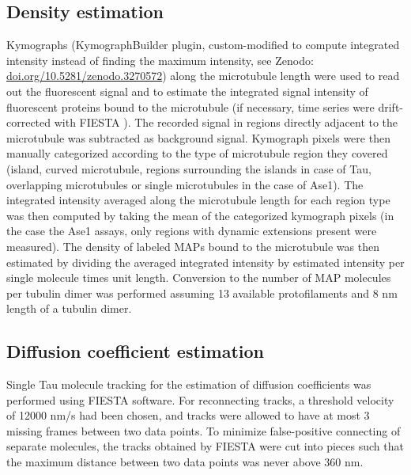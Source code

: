 \subsection{Density estimation}
Kymographs (KymographBuilder plugin, custom-modified to compute integrated intensity instead of finding the maximum intensity, see Zenodo: \url{doi.org/10.5281/zenodo.3270572}) along the microtubule length were used to read out the fluorescent signal and to estimate the integrated signal intensity of fluorescent proteins bound to the microtubule (if necessary, time series were drift-corrected with FIESTA \parencite{RUHNOW20112820}). The recorded signal in regions directly adjacent to the microtubule was subtracted as background signal. Kymograph pixels were then manually categorized according to the type of microtubule region they covered (island, curved microtubule, regions surrounding the islands in case of Tau, overlapping microtubules or single microtubules in the case of Ase1). The integrated intensity averaged along the microtubule length for each region type was then computed by taking the mean of the categorized kymograph pixels (in the case the Ase1 assays, only regions with dynamic extensions present were measured). The density of labeled MAPs bound to the microtubule was then estimated by dividing the averaged integrated intensity by estimated intensity per single molecule times unit length. Conversion to the number of MAP molecules per tubulin dimer was performed assuming 13 available protofilaments and 8 nm length of a tubulin dimer.

\subsection{Diffusion coefficient estimation} 
Single Tau molecule tracking for the estimation of diffusion coefficients was performed using FIESTA \parencite{RUHNOW20112820} software. For reconnecting tracks, a threshold velocity of 12000 nm/s had been chosen, and tracks were allowed to have at most 3 missing frames between two data points. To minimize false-positive connecting of separate molecules, the tracks obtained by FIESTA were cut into pieces such that the maximum distance between two data points was never above 360 nm.

